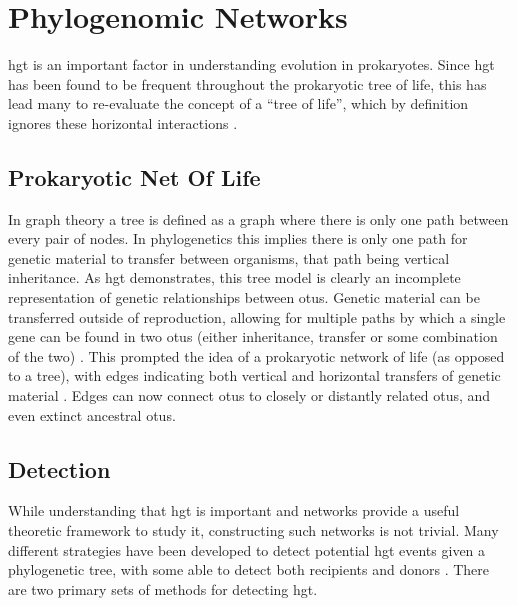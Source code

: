 \section*{Phylogenomic Networks}
\ac{hgt} is an important factor in understanding evolution in prokaryotes.
Since \ac{hgt} has been found to be frequent throughout the prokaryotic tree of life, this has lead many to re-evaluate the concept of a ``tree of life'', which by definition ignores these horizontal interactions \citep{netoflife}.
\subsection*{Prokaryotic Net Of Life}
In graph theory a tree is defined as a graph where there is only one path between every pair of nodes.
In phylogenetics this implies there is only one path for genetic material to transfer between organisms, that path being vertical inheritance.
As \ac{hgt} demonstrates, this tree model is clearly an incomplete representation of genetic relationships between \ac{otu}s.
Genetic material can be transferred outside of reproduction, allowing for multiple paths by which a single gene can be found in two \ac{otu}s (either inheritance, transfer or some combination of the two) \citep{lgt}.
This prompted the idea of a prokaryotic network of life (as opposed to a tree), with edges indicating both vertical and horizontal transfers of genetic material \citep{netoflife}.
Edges can now connect \ac{otu}s to closely or distantly related \ac{otu}s, and even extinct ancestral \ac{otu}s.
\subsection*{Detection}%
While understanding that \ac{hgt} is important and networks provide a useful theoretic framework to study it, constructing such networks is not trivial.
Many different strategies have been developed to detect potential \ac{hgt} events given a phylogenetic tree, with some able to detect both recipients and donors \citep{ihgt}.
There are two primary sets of methods for detecting \ac{hgt}.
